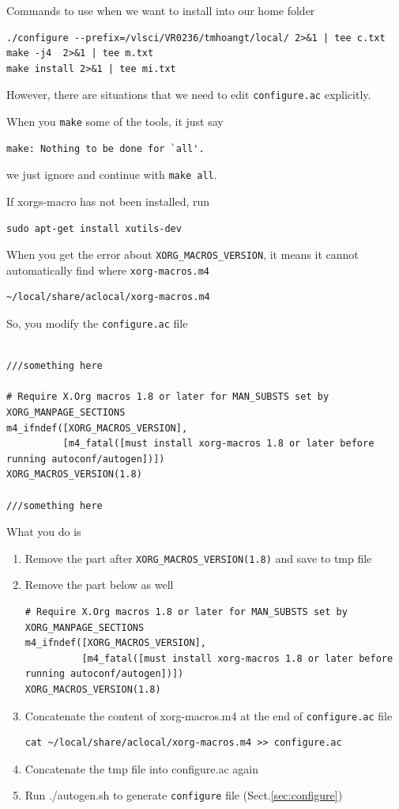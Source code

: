 Commands to use when we want to install into our home folder
\begin{verbatim}
./configure --prefix=/vlsci/VR0236/tmhoangt/local/ 2>&1 | tee c.txt
make -j4  2>&1 | tee m.txt
make install 2>&1 | tee mi.txt
\end{verbatim}
However, there are situations that we need to edit \verb!configure.ac!
explicitly.

When you \verb!make! some of the tools, it just say
\begin{verbatim}
make: Nothing to be done for `all'.
\end{verbatim}
we just ignore and continue with \verb!make all!.

\label{sec:xorgs-macro}
If xorgs-macro has not been installed, run
\begin{verbatim}
sudo apt-get install xutils-dev
\end{verbatim}

When you get the error about \verb!XORG_MACROS_VERSION!, it means it cannot
automatically find where \verb!xorg-macros.m4!
\begin{verbatim}
~/local/share/aclocal/xorg-macros.m4 
\end{verbatim}
So, you modify the \verb!configure.ac! file
\begin{verbatim}

///something here

# Require X.Org macros 1.8 or later for MAN_SUBSTS set by XORG_MANPAGE_SECTIONS
m4_ifndef([XORG_MACROS_VERSION],
          [m4_fatal([must install xorg-macros 1.8 or later before running autoconf/autogen])])
XORG_MACROS_VERSION(1.8)

///something here
\end{verbatim}
What you do is
\begin{enumerate}
  \item Remove the part after \verb!XORG_MACROS_VERSION(1.8)! and save to tmp
  file
  \item Remove the part below as well
\begin{verbatim}
# Require X.Org macros 1.8 or later for MAN_SUBSTS set by XORG_MANPAGE_SECTIONS
m4_ifndef([XORG_MACROS_VERSION],
          [m4_fatal([must install xorg-macros 1.8 or later before running autoconf/autogen])])
XORG_MACROS_VERSION(1.8)
\end{verbatim}  

  \item Concatenate the content of xorg-macros.m4 at the end of
  \verb!configure.ac! file
  \begin{verbatim}
cat ~/local/share/aclocal/xorg-macros.m4 >> configure.ac
  \end{verbatim}
  \item Concatenate the tmp file into configure.ac again
  \item Run ./autogen.sh to generate \verb!configure! file
  (Sect.\ref{sec:configure})
\end{enumerate}

